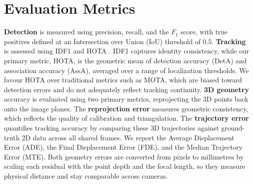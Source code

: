 \section{Evaluation Metrics}\label{sec:evaluation}

\textbf{Detection} is measured using precision, recall, and the $F_1$ score, with true positives defined at an Intersection over Union (IoU) threshold of $0.5$.
\textbf{Tracking} is assessed using IDF1 and HOTA \cite{hota}.
IDF1 captures identity consistency, while our primary metric, HOTA, is the geometric mean of detection accuracy (DetA) and association accuracy (AssA), averaged over a range of localization thresholds.
We favour HOTA over traditional metrics such as MOTA, which are biased toward detection errors and do not adequately reflect tracking continuity.
\textbf{3D geometry} accuracy is evaluated using two primary metrics, reprojecting the 3D points back onto the image planes.
The \textbf{reprojection error} measures geometric consistency, which reflects the quality of calibration and triangulation.
The \textbf{trajectory error} quantifies tracking accuracy by comparing these 3D trajectories against ground-truth 2D data across all shared frames.
We report the Average Displacement Error (ADE), the Final Displacement Error (FDE), and the Median Trajectory Error (MTE).
Both geometry errors are converted from pixels to millimetres by scaling each residual with the point depth and the focal length, so they measure physical distance and stay comparable across cameras.
